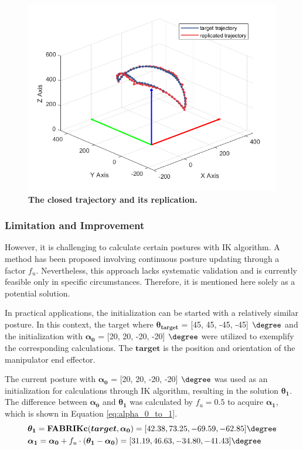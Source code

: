 \begin{figure}[H] %
    \centering 
    \captionsetup{labelsep=colon}
    \includegraphics[width=.9\textwidth]{Image/Result/circle_trajectory_replication.png} 
    \caption[The closed trajectory and its replication by IK algorithm]
    {\centering \textbf{The closed trajectory and its replication.}}
    \label{fig:clc_cross}
\end{figure}
\subsubsection{Limitation and Improvement}
However, it is challenging to calculate certain postures with IK algorithm. A method has 
been proposed involving continuous posture updating through a factor $f_u$. Nevertheless, this approach 
lacks systematic validation and is currently feasible only in specific circumstances. Therefore, it is 
mentioned here solely as a potential solution.

In practical applications, the initialization can be started with a relatively similar posture. 
In this context, the target where $\boldsymbol{\theta_{target}}$ = 
[45, 45, -45, -45] $\degree$ and the initialization with $\boldsymbol{\alpha_0}$ = [20, 20, -20, -20] $\degree$ 
were utilized to exemplify the corresponding calculations. The $\boldsymbol{target}$ is the position and 
orientation of the manipulator end effector.

The current posture with $\boldsymbol{\alpha_0}$  = [20, 20, -20, -20] $\degree$ was used as an initialization 
for calculations through IK algorithm, resulting in the solution $\boldsymbol{\theta_1}$. 
The difference between $\boldsymbol{\alpha_0}$ and $\boldsymbol{\theta_1}$ was calculated by $f_u = 0.5$ to acquire 
$\boldsymbol{\alpha_1}$, which is shown in Equation \ref{eq:alpha_0_to_1}.
\begin{align}
    &\boldsymbol{\theta_1} = \textbf{FABRIKc}(\boldsymbol{target}, \boldsymbol{\alpha_0}) 
    = [42.38, 73.25, -69.59, -62.85]\degree \nonumber \\
    &\boldsymbol{\alpha_1} = \boldsymbol{\alpha_0} + f_u \cdot (\boldsymbol{\theta_1} - \boldsymbol{\alpha_0}) 
    = [31.19, 46.63, -34.80, -41.43]\degree
    \label{eq:alpha_0_to_1}
\end{align}

